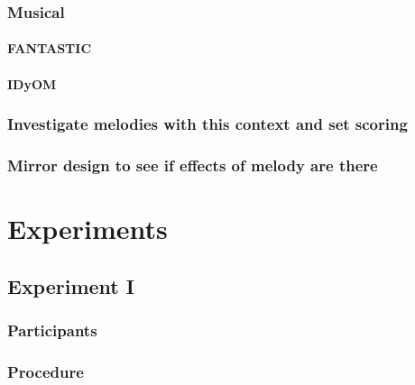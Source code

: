 \documentclass[]{book}
\let\oldparagraph\paragraph
\renewcommand{\paragraph}[1]{\oldparagraph{#1}\mbox{}}
\begin{document}
\hypertarget{musical}{%
\subsubsection{Musical}\label{musical}}

\hypertarget{fantastic}{%
\paragraph{FANTASTIC}\label{fantastic}}

\hypertarget{idyom}{%
\paragraph{IDyOM}\label{idyom}}

\hypertarget{investigate-melodies-with-this-context-and-set-scoring}{%
\subsubsection{Investigate melodies with this context and set scoring}\label{investigate-melodies-with-this-context-and-set-scoring}}

\hypertarget{mirror-design-to-see-if-effects-of-melody-are-there}{%
\subsubsection{Mirror design to see if effects of melody are there}\label{mirror-design-to-see-if-effects-of-melody-are-there}}

\hypertarget{experiments-1}{%
\section{Experiments}\label{experiments-1}}

\hypertarget{experiment-i}{%
\subsection{Experiment I}\label{experiment-i}}

\hypertarget{participants-1}{%
\subsubsection{Participants}\label{participants-1}}

\hypertarget{procedure-1}{%
\subsubsection{Procedure}\label{procedure-1}}
\end{document}
